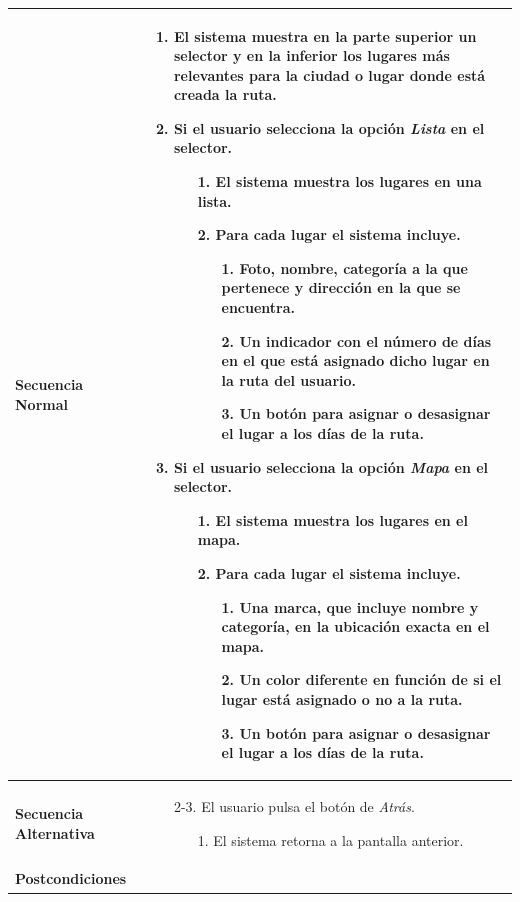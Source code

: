 \begin{longtable}{| p{4cm} | p{10cm} |}
\hline
\textbf{Secuencia Normal} &\mbox{}\par\vspace{-\baselineskip}
\begin{enumerate}[leftmargin=0.7cm, topsep=0.1cm]
\item El sistema muestra en la parte superior un selector y en la inferior los lugares más relevantes para la ciudad o lugar donde está creada la ruta.
\item Si el usuario selecciona la opción \textit{Lista} en el selector.
	\begin{itemize}
	\item[1.] El sistema muestra los lugares en una lista.
	\item[2.] Para cada lugar el sistema incluye.
		\begin{itemize}
		\item[1.] Foto, nombre, categoría a la que pertenece y dirección en la que se encuentra.
		\item[2.] Un indicador con el número de días en el que está asignado dicho lugar en la ruta del usuario.
		\item[3.] Un botón para asignar o desasignar el lugar a los días de la ruta.
		\end{itemize}
	\end{itemize}
\item Si el usuario selecciona la opción \textit{Mapa} en el selector.
	\begin{itemize}
	\item[1.] El sistema muestra los lugares en el mapa.
	\item[2.] Para cada lugar el sistema incluye.
		\begin{itemize}
		\item[1.] Una marca, que incluye nombre y categoría, en la ubicación exacta en el mapa.
		\item[2.] Un color diferente en función de si el lugar está asignado o no a la ruta.
		\item[3.] Un botón para asignar o desasignar el lugar a los días de la ruta.
		\end{itemize}
	\end{itemize}
\end{enumerate}


\\
\hline
\textbf{Secuencia Alternativa} &\mbox{}\par\vspace{-\baselineskip}
\begin{enumerate}[leftmargin=0.9cm, topsep=0.1cm]
\item[2-3.] El usuario pulsa el botón de \textit{Atrás}.
	\begin{itemize}
	\item[1.] El sistema retorna a la pantalla anterior.
	\end{itemize}
\end{enumerate}
\\

\hline
\textbf{Postcondiciones} & \\
\hline
\end{longtable}


